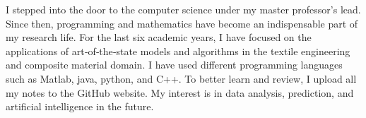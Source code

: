 \cvsection{}


\begin{cvparagraph}
I stepped into the door to the computer science under my master professor's
lead. Since then, programming and mathematics have become an indispensable part
of my research life. For the last six academic years, I have focused on the
applications of art‐of‐the‐state models and algorithms in the textile
engineering and composite material domain. I have used different programming
languages such as Matlab, java, python, and C++. To better learn and review, I
upload all my notes to the GitHub website. My interest is in data analysis,
prediction, and artificial intelligence in the future.
\end{cvparagraph}
